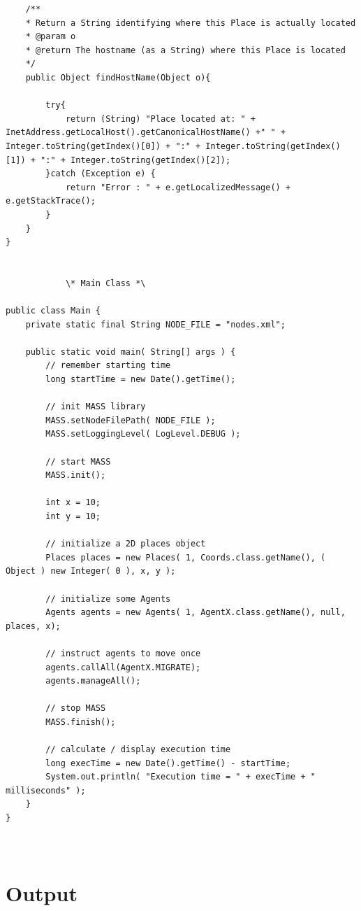 \documentclass{article}
\begin{document}
\begin{lstlisting}
	/**
	* Return a String identifying where this Place is actually located
	* @param o
	* @return The hostname (as a String) where this Place is located
	*/
	public Object findHostName(Object o){
	
		try{
			return (String) "Place located at: " + InetAddress.getLocalHost().getCanonicalHostName() +" " + Integer.toString(getIndex()[0]) + ":" + Integer.toString(getIndex()[1]) + ":" + Integer.toString(getIndex()[2]);
		}catch (Exception e) {
			return "Error : " + e.getLocalizedMessage() + e.getStackTrace();
		}
	}
}		


			\* Main Class *\
			
public class Main {
	private static final String NODE_FILE = "nodes.xml";	
 
	public static void main( String[] args ) {
		// remember starting time
		long startTime = new Date().getTime();
		
		// init MASS library
		MASS.setNodeFilePath( NODE_FILE );
		MASS.setLoggingLevel( LogLevel.DEBUG );
		
		// start MASS
		MASS.init();
		
		int x = 10;
		int y = 10;

		// initialize a 2D places object
		Places places = new Places( 1, Coords.class.getName(), ( Object ) new Integer( 0 ), x, y );
		
		// initialize some Agents
		Agents agents = new Agents( 1, AgentX.class.getName(), null, places, x);

		// instruct agents to move once
		agents.callAll(AgentX.MIGRATE);
		agents.manageAll();

		// stop MASS
		MASS.finish();
		
		// calculate / display execution time
		long execTime = new Date().getTime() - startTime;
		System.out.println( "Execution time = " + execTime + " milliseconds" );
	}
}
			
			
			\end{lstlisting}
			
	
	\section{Output} \label{OUT}
	
\end{document}
